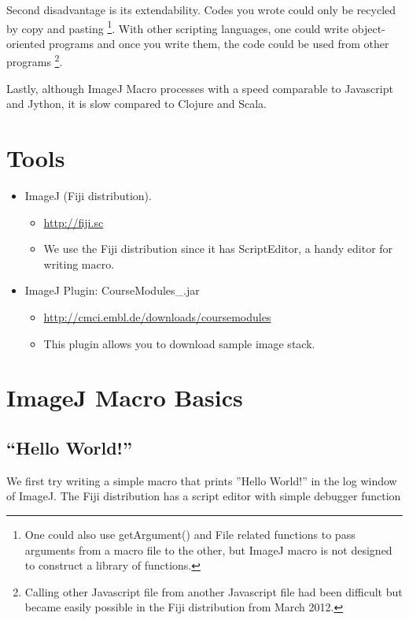 Second disadvantage is its extendability.
Codes you wrote could only be recycled by copy and pasting
\footnote{One could also use getArgument() and File related functions to pass
arguments from a macro file to the other, but ImageJ macro is not designed to
construct a library of functions.}.
With other scripting languages, one could write object-oriented programs 
and once you write them, the code could be used from other programs
\footnote{ Calling other Javascript file from another Javascript file had been difficult but became easily possible in the Fiji distribution from March 2012.}.

Lastly, although ImageJ Macro processes with a speed comparable to
Javascript and Jython, it is slow compared to Clojure and Scala. 


\section{Tools}
\label{sec:tools}

\begin{itemize}
    \item ImageJ (Fiji distribution).
    \begin{itemize}
        \item \url{http://fiji.sc}
	\item We use the Fiji distribution since it has ScriptEditor, a handy editor for writing macro. 
    \end{itemize}
    \item ImageJ Plugin: CourseModules\_.jar
      \begin{itemize}
        \item \url{http://cmci.embl.de/downloads/coursemodules}
        \item This plugin allows you to download sample image stack.
      \end{itemize}
\end{itemize}


\section{ImageJ Macro Basics}

\subsection{``Hello World!''}
We first try writing a simple macro that prints ''Hello World!'' in the log window of ImageJ. 
The Fiji distribution has a script editor with simple debugger function

